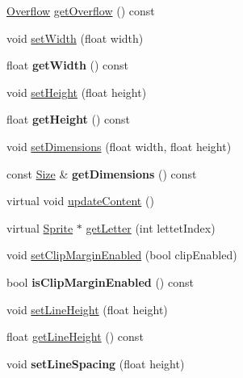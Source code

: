 \begin{DoxyCompactItemize}
\item 
\hyperlink{classLabel_af7d31998ea743e8ca64eb1a983fa6a4c}{Overflow} \hyperlink{classLabel_a7645d8e62f623c8ac0d543f83b82fcae}{get\+Overflow} () const
\item 
void \hyperlink{classLabel_a4f92bf5284beb87cf0315284a9a1c04d}{set\+Width} (float width)
\item 
\mbox{\label{classLabel_ad735a37a0747f4ee413f177d0fea6ea0}} 
float {\bfseries get\+Width} () const
\item 
void \hyperlink{classLabel_a71ad7b5b1bd01d2d903a560cf33f151d}{set\+Height} (float height)
\item 
\mbox{\label{classLabel_a271ba34622aa967dc9871cca3a1fd949}} 
float {\bfseries get\+Height} () const
\item 
void \hyperlink{classLabel_a7e555d440bd15d0cc955c725eedffe4f}{set\+Dimensions} (float width, float height)
\item 
\mbox{\label{classLabel_a2f516e81d58f6f9f2a9e3d4f4725cc30}} 
const \hyperlink{classSize}{Size} \& {\bfseries get\+Dimensions} () const
\item 
virtual void \hyperlink{classLabel_a183778bfa4b5172aa1659bd95c3f58ad}{update\+Content} ()
\item 
virtual \hyperlink{classSprite}{Sprite} $\ast$ \hyperlink{classLabel_a32b5de8c5fac5c9084eb713ff4ce9f3b}{get\+Letter} (int lettet\+Index)
\item 
void \hyperlink{classLabel_ae882e2499324c73c9852fb573aa0de5c}{set\+Clip\+Margin\+Enabled} (bool clip\+Enabled)
\item 
\mbox{\label{classLabel_a9ec18e7fdfd25b1b83d868dace902ce6}} 
bool {\bfseries is\+Clip\+Margin\+Enabled} () const
\item 
void \hyperlink{classLabel_acb0bd4b5aa05360a85f18def21cd7e4d}{set\+Line\+Height} (float height)
\item 
float \hyperlink{classLabel_afec75d9e7948756cee3ed98c4a94b6b4}{get\+Line\+Height} () const
\item 
\mbox{\label{classLabel_a2b57d1ea1eed05465a8e90de90381ecb}} 
void {\bfseries set\+Line\+Spacing} (float height)
\item 
\mbox{\label{classLabel_ab2917c3dc5d5106baef1ed66dded37ce}} 

\end{DoxyCompactItemize}
